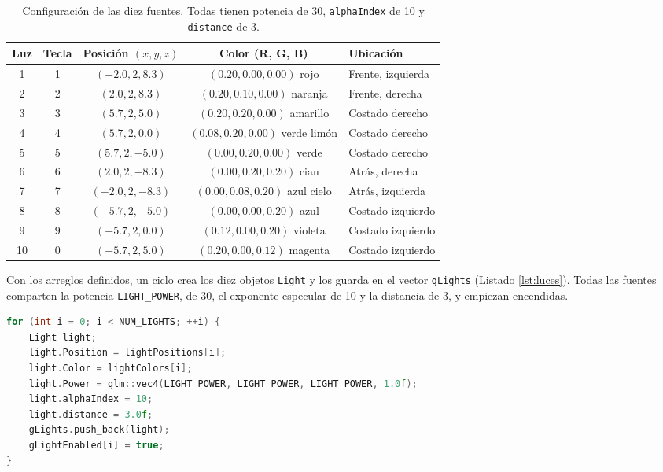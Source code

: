 \begin{table}[H]
\centering
\renewcommand{\arraystretch}{1.2}
\begin{tabular}{|c|c|c|c|l|}
\hline
\textbf{Luz} & \textbf{Tecla} & \textbf{Posición $(x, y, z)$} & \textbf{Color (R, G, B)} & \textbf{Ubicación} \\ \hline
1  & 1 & $(-2.0, 2, 8.3)$  & $(0.20, 0.00, 0.00)$ rojo        & Frente, izquierda \\ \hline
2  & 2 & $(2.0, 2, 8.3)$   & $(0.20, 0.10, 0.00)$ naranja     & Frente, derecha \\ \hline
3  & 3 & $(5.7, 2, 5.0)$   & $(0.20, 0.20, 0.00)$ amarillo    & Costado derecho \\ \hline
4  & 4 & $(5.7, 2, 0.0)$   & $(0.08, 0.20, 0.00)$ verde limón & Costado derecho \\ \hline
5  & 5 & $(5.7, 2, -5.0)$  & $(0.00, 0.20, 0.00)$ verde       & Costado derecho \\ \hline
6  & 6 & $(2.0, 2, -8.3)$  & $(0.00, 0.20, 0.20)$ cian        & Atrás, derecha \\ \hline
7  & 7 & $(-2.0, 2, -8.3)$ & $(0.00, 0.08, 0.20)$ azul cielo  & Atrás, izquierda \\ \hline
8  & 8 & $(-5.7, 2, -5.0)$ & $(0.00, 0.00, 0.20)$ azul        & Costado izquierdo \\ \hline
9  & 9 & $(-5.7, 2, 0.0)$  & $(0.12, 0.00, 0.20)$ violeta     & Costado izquierdo \\ \hline
10 & 0 & $(-5.7, 2, 5.0)$  & $(0.20, 0.00, 0.12)$ magenta     & Costado izquierdo \\ \hline
\end{tabular}
\caption{Configuración de las diez fuentes. Todas tienen potencia de 30, \texttt{alphaIndex} de 10 y \texttt{distance} de 3.}
\label{tab:luces}
\end{table}

Con los arreglos definidos, un ciclo crea los diez objetos \texttt{Light} y los guarda en el vector \texttt{gLights} (Listado \ref{lst:luces}). Todas las fuentes comparten la potencia \texttt{LIGHT\_POWER}, de 30, el exponente especular de 10 y la distancia de 3, y empiezan encendidas.

\begin{lstlisting}[language=C++, firstnumber=191, caption={Creación de las diez fuentes en Start() (08\_IllumModels2.cpp).}, label={lst:luces}]
for (int i = 0; i < NUM_LIGHTS; ++i) {
	Light light;
	light.Position = lightPositions[i];
	light.Color = lightColors[i];
	light.Power = glm::vec4(LIGHT_POWER, LIGHT_POWER, LIGHT_POWER, 1.0f);
	light.alphaIndex = 10;
	light.distance = 3.0f;
	gLights.push_back(light);
	gLightEnabled[i] = true;
}
\end{lstlisting}

